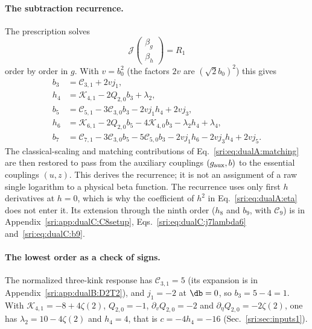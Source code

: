 \paragraph{The subtraction recurrence.} The prescription solves
\begin{equation}
 \mathcal J\begin{pmatrix}\beta_g\\ \beta_h\end{pmatrix}=R_1
 \label{sri:eq:dualA:system}
\end{equation}
order by order in $g$. With $v=b_0^2$ (the factors $2v$ are $(\sqrt2b_0)^2$) this gives
\begin{equation}
\begin{aligned}
 b_3&=\mathcal C_{3,1}+2vj_1,\\
 h_4&=\mathcal K_{4,1}-2Q_{2,0}b_3+\lambda_2,\\
 b_5&=\mathcal C_{5,1}-3\mathcal C_{3,0}b_3-2vj_1h_4+2vj_3,\\
 h_6&=\mathcal K_{6,1}-2Q_{2,0}b_5-4\mathcal K_{4,0}b_3-\lambda_2h_4+\lambda_4,\\
 b_7&=\mathcal C_{7,1}-3\mathcal C_{3,0}b_5-5\mathcal C_{5,0}b_3-2vj_1h_6-2vj_3h_4+2vj_5.
\end{aligned}
\label{sri:eq:dualA:recurrence}
\end{equation}
The classical-scaling and matching contributions of Eq.~\eqref{sri:eq:dualA:matching} are then restored to pass from the
auxiliary couplings $(g_{\rm aux},b)$ to the essential couplings $(u,z)$. This derives the recurrence; it is not an
assignment of a raw single logarithm to a physical beta function. The recurrence uses only first $h$ derivatives at
$h=0$, which is why the coefficient of $h^2$ in Eq.~\eqref{sri:eq:dualA:eta} does not enter it. Its extension through
the ninth order ($h_8$ and $b_9$, with $\mathcal C_9$) is in Appendix~\ref{sri:app:dualC:C8setup}, Eqs.~\eqref{sri:eq:dualC:j7lambda6} and~\eqref{sri:eq:dualC:b9}.

\paragraph{The lowest order as a check of signs.} The normalized three-kink response has
$\mathcal C_{3,1}=5$ (its expansion is in Appendix~\ref{sri:app:dualB:D2T2}), and $j_1=-2$ at $\db=0$, so
$b_3=5-4=1$. With $\mathcal K_{4,1}=-8+4\zeta(2)$, $Q_{2,0}=-1$, $\partial_vQ_{2,0}=-2$ and
$\partial_\eta Q_{2,0}=-2\zeta(2)$, one has $\lambda_2=10-4\zeta(2)$ and $h_4=4$, that is $c=-4h_4=-16$
(Sec.~\ref{sri:sec:inputs1}).

